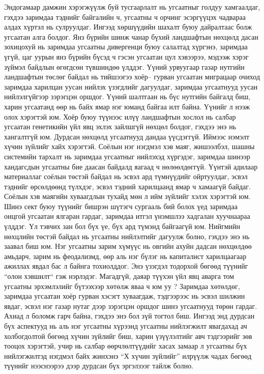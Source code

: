 Эндогамаар дамжин хэрэгжүүлж буй тусгаарлалт нь угсаатныг голдуу хамгаалдаг, гэхдээ заримдаа тэднийг байгалийн ч, угсаатны ч орчинг эсэргүүцэх чадвараа алдах хүртэл нь сулруулдаг. Ингээд хөршүүдийн шахалт буюу дайралтаас болж угсаатан алга болдог.
Янз бүрийн шинж чанар бүхий ландшафтын нөхцөлд дасан зохицохуй нь заримдаа угсаатны дивергенци буюу салалтад хүргэнэ, заримдаа үгүй, цаг уурын янз бүрийн бүсэд ч гэсэн угсаатан цул хэвээрээ, мэдээж хэрэг зүймэл байдлын өгөгдсөн түвшиндөө үлддэг.
Үүний урвуугаар газар нутгийн ландшафтын төслөг байдал нь тийшээгээ хоёр– гурван угсаатан миграцаар очиход заримдаа харилцан уусан нийлэх үзэгдлийг дагуулдаг, заримдаа угсаатнууд уусан нийлэлгүйгээр зэрэгцэн оршдог. Үүний шалтгаан нь бүс нутгийн байгалд биш, харин угсаатанд өөр нь байх ямар нэг юманд байгаа илт байна. Үүнийг л нээж олох хэрэгтэй юм.
Хоёр буюу түүнээс илүү ландшафтын хослол нь салбар угсаатан генетикийн үйл явц эхлэх зайлшгүй нөхцөл болдог, гэхдээ энэ нь хангалтгүй юм. Дурдсан нөхцөлд угсаатнууд дандаа үүсдэггүй. Иймээс нэмэлт хүчин зүйлийг хайх хэрэгтэй.
Соёлын нэг нэгдмэл хэв маяг, жишээлбэл, шашны системийн тархалт нь заримдаа угсаатныг нийлэхэд хүргэдэг, заримдаа шинээр хандагсдын угсаатны бие даасан байдалд яагаад ч нөлөөлдөггүй. Үүнтэй адилаар материаллаг соёлын төстэй байдал нь эсвэл ард түмнүүдийг ойртуулдаг, эсвэл тэднийг өрсөлдөөнд түлхдэг, эсвэл тэдний харилцаанд ямар ч хамаагүй байдаг. Соёлын хэв маягийн хуваагдлын тухайд мөн л ийм зүйлийг хэлэх хэрэгтэй юм. Шинэ сект буюу түүнийг бишрэн шүтэгч сургааль бий болох үед заримдаа онцгой угсаатан ялгаран гардаг, заримдаа итгэл үнэмшлээ хадгалан хуучнаараа үлддэг. Үл тэвчих зан бол бүх үе, бүх ард түмэнд байгаагүй юм.
Нийгмийн нөхцлийн төстэй байдал нь угсаатны нийлэлтийг дагуулж болно, гэхдээ энэ нь заавал биш юм. Нэг угсаатны зарим хүмүүс нь овгийн ахуйн дадсан нөхцөлдөө амьдарч, зарим нь феодализмд, өөр аль нэг бүлэг нь капиталист харилцаагаар ажиллах явдал бас л байнга тохиолддог. Энэ үзэгдэл тодорхой бөгөөд түүнийг “олон хэвшилт“ гэж нэрлэдэг.
Магадгүй, даяар түүхэн үйл явц аварга том угсаатны эрхэмлэлийг бүтээхээр хөтөлж яваа ч юм уу ? Заримдаа хөтөлдөг, заримдаа угсаатан хоёр гурван хэсэгт хуваагдаж, тэдгээрээс нь эсвэл шилжин явдаг, эсвэл нэг газар нутаг дээр зэрэгцэн оршдог шинэ угсаатнууд төрөн гардаг. Ахиад л боломж гарч байна, гэхдээ энэ бол зүй тогтол биш.
Ингээд энд дурдсан бүх аспектууд нь аль нэг угсаатны хүрээнд угсаатны нийлэгжилт явагдахад ач холбогдолтой бөгөөд хүчин зүйлийг биш, харин үзүүлэлтийг авч тэдгээрийг зөв тооцох хэрэгтэй, учир нь салбар өөрчлөлтүүдийг хасах замаар л угсаатны бүх нийлэгжилтэд нэгдмэл байх жинхэнэ “Х хүчин зүйлийг” илрүүлж чадах бөгөөд түүнийг нээснээрээ дээр дурдсан бүх эргэлзээг тайлж болно.
